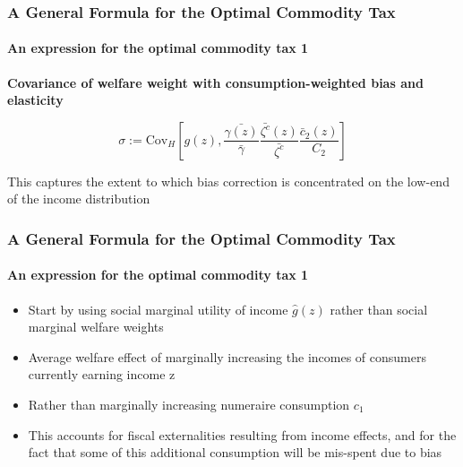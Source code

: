 \documentclass{beamer}
\newcommand{\Cov}{\mathrm{Cov}}
\begin{document}
\begin{frame}
\frametitle{A General Formula for the Optimal Commodity Tax}
\framesubtitle{An expression for the optimal commodity tax 1}

\textbf{ Covariance of welfare weight with consumption-weighted bias and elasticity}

$$ \sigma := \Cov_H \left[ g(z), \frac{\bar{\gamma(z)}}{\bar{\gamma}} \frac{\bar{\zeta^c}(z)}{\bar{\zeta^c}}
\frac{\bar{c}_2(z)}{C_2 }  \right] $$

This captures the extent to which bias correction is concentrated on the low-end of the income distribution

\end{frame}



\begin{frame}
\frametitle{A General Formula for the Optimal Commodity Tax}
\framesubtitle{An expression for the optimal commodity tax 1}

\begin{itemize}
	\item Start by using social marginal utility of income  $\hat{g}(z)$ rather than social marginal welfare weights
	\item Average welfare effect of marginally increasing the incomes of consumers currently earning income
	z
	\item Rather than marginally increasing numeraire consumption $c_1$
	\item This accounts for fiscal externalities resulting from income effects, and for the fact that some of this additional consumption will be mis-spent due to bias
\end{itemize} 

\end{frame}
\end{document}
